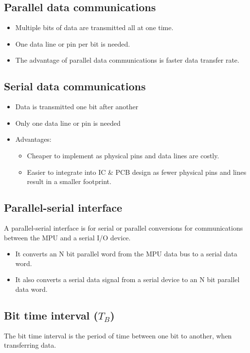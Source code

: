 \documentclass[11pt]{article}
\begin{document}
\subsection{Parallel data communications}
\label{sec:org24c2b58}
\begin{itemize}
\item Multiple bits of data are transmitted all at one time.
\item One data line or pin per bit is needed.
\item The advantage of parallel data communications is faster data transfer rate.
\end{itemize}

\subsection{Serial data communications}
\label{sec:orgc6ac4e8}
\begin{itemize}
\item Data is transmitted one bit after another
\item Only one data line or pin is needed
\item Advantages:
\begin{itemize}
\item Cheaper to implement as physical pins and data lines are costly.
\item Easier to integrate into IC \& PCB design as fewer physical pins and lines result in a smaller footprint.
\end{itemize}
\end{itemize}

\subsection{Parallel-serial interface}
\label{sec:org730a9da}
A parallel-serial interface is for serial or parallel conversions for communications between the MPU and a serial I/O device.
\begin{itemize}
\item It converts an N bit parallel word from the MPU data bus to a serial data word.
\item It also converts a serial data signal from a serial device to an N bit parallel data word.
\end{itemize}

\subsection{Bit time interval (\(T_B\))}
\label{sec:org401f05e}
The bit time interval is the period of time between one bit to another, when transferring data.
\end{document}
